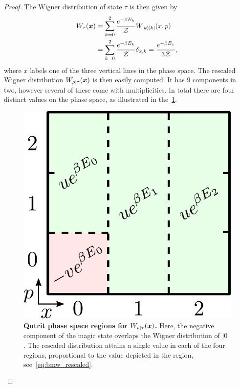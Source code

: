 \documentclass[pra,
aps,
twocolumn,
superscriptaddress,
groupedaddress,
nofootinbib,
reprint
]{revtex4-1}
\begin{document}
\begin{proof}
The Wigner distribution of state $\tau$ is then given by
\begin{align}
	\W[\bmx]{\tau} &= \sum\limits_{k=0}^2 \frac{e^{-\beta E_k}}{\Z}W_{\ketbra{k}}(x, p) \nonumber\\
	&= \sum\limits_{k=0}^2 \frac{e^{-\beta E_k}}{\Z} \delta_{x, k} = \frac{e^{-\beta E_x}}{3\Z},
\end{align}
where $x$ labels one of the three vertical lines in the phase space.
The rescaled Wigner distribution $W_{\rho|\tau}(\boldsymbol{x})$ is then easily computed. It has $9$ components in two, however several of these come with multiplicities. In total there are four distinct values on the phase space, as illustrated in the~\cref{fig:pd_split}.
\begin{figure}[h]
    \centering
    \includegraphics[scale=0.45]{figs/pd_split_thermal.pdf}
    \caption{\textbf{Qutrit phase space regions for $W_{\rho | \tau}(\boldsymbol{x})$.}
    Here, the negative component of the magic state overlaps the Wigner distribution of $|0\>$. The rescaled distribution attains a single value in each of the four regions, proportional to the value depicted in the region, see~\cref{eq:bmw_rescaled}.
    }
    \label{fig:pd_split}
\end{figure}


\end{proof}
\end{document}
